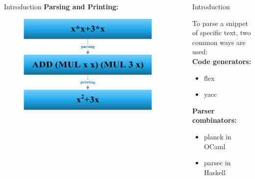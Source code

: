 \documentclass[final]{beamer}
\newlength{\sepwid}
\newlength{\onecolwid}
\newlength{\twocolwid}
\begin{document}
\begin{frame}[t]
\begin{columns}[t]
\begin{column}{\onecolwid}
\begin{block}{Introduction}
\textbf{Parsing and Printing:}

\begin{figure}
\includegraphics[width=0.75\linewidth]{img/parseprintershort.jpg}
\end{figure}


\end{block}


\end{column} %

\begin{column}{\sepwid}\end{column} %

\begin{column}{\twocolwid} %

\begin{columns}[t,totalwidth=\twocolwid] %

\begin{column}{\onecolwid}\vspace{-.6in} %


\begin{block}{Introduction}

To parse a snippet of specific text, two common ways are used: \\
\textbf{Code generators:}
\begin{itemize}
\item flex
\item yacc
\end{itemize}
\textbf{Parser combinators:}
\begin{itemize}
\item planck in OCaml
\item parsec in Haskell
\end{itemize}


\end{block}
\end{column}
\end{columns}
\end{column}
\end{columns}
\end{frame}
\end{document}
